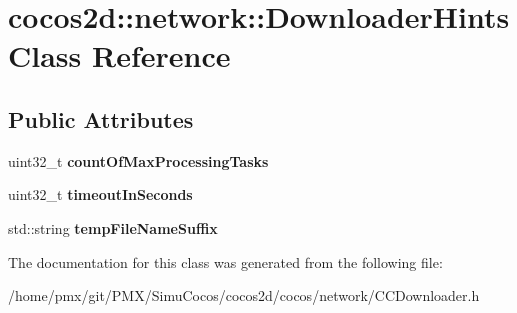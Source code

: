 \hypertarget{classcocos2d_1_1network_1_1DownloaderHints}{}\section{cocos2d\+:\+:network\+:\+:Downloader\+Hints Class Reference}
\label{classcocos2d_1_1network_1_1DownloaderHints}
\subsection*{Public Attributes}
\begin{DoxyCompactItemize}
\item 
\mbox{\label{classcocos2d_1_1network_1_1DownloaderHints_ab6422952327ef76aabfa043c5a7dced3}} 
uint32\+\_\+t {\bfseries count\+Of\+Max\+Processing\+Tasks}
\item 
\mbox{\label{classcocos2d_1_1network_1_1DownloaderHints_a142ee5392d56684054094b30bf578104}} 
uint32\+\_\+t {\bfseries timeout\+In\+Seconds}
\item 
\mbox{\label{classcocos2d_1_1network_1_1DownloaderHints_a8311fc8de4cf8305cc30debff5a5f93f}} 
std\+::string {\bfseries temp\+File\+Name\+Suffix}
\end{DoxyCompactItemize}


The documentation for this class was generated from the following file\+:\begin{DoxyCompactItemize}
\item 
/home/pmx/git/\+P\+M\+X/\+Simu\+Cocos/cocos2d/cocos/network/C\+C\+Downloader.\+h\end{DoxyCompactItemize}
